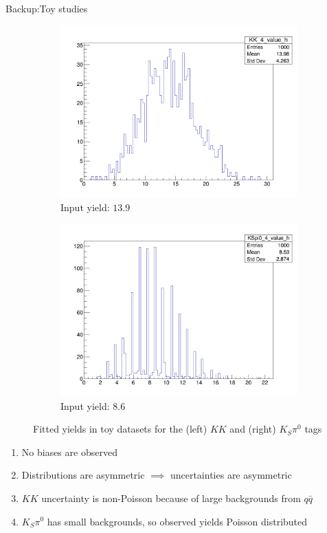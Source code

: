 \documentclass{beamer}
\begin{document}
\begin{frame}{Backup:Toy studies}
  \begin{figure}
    \centering
    \begin{subfigure}{0.5\textwidth}
      \centering
      \includegraphics[width=1.0\textwidth]{Plots/KK_ToyYields_Bin4.png}
      \caption{Input yield: $13.9$}
    \end{subfigure}%
    \begin{subfigure}{0.5\textwidth}
      \centering
      \includegraphics[width=1.0\textwidth]{Plots/KSpi0_ToyYields_Bin4.png}
      \caption{Input yield: $8.6$}
    \end{subfigure}
    \caption{Fitted yields in toy datasets for the (left) $KK$ and (right) $K_S\pi^0$ tags}
  \end{figure}
  \vspace{-0.4cm}
  \begin{enumerate}
    \item{No biases are observed}
    \item{Distributions are asymmetric $\implies$ uncertainties are asymmetric}
    \item{$KK$ uncertainty is non-Poisson because of large backgrounds from $q\bar{q}$}
    \item{$K_S\pi^0$ has small backgrounds, so observed yields Poisson distributed}
  \end{enumerate}
\end{frame}
\end{document}
